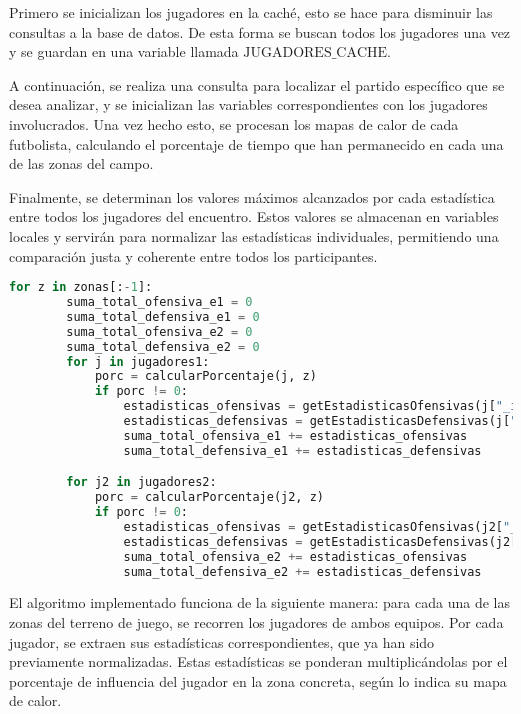 Primero se inicializan los jugadores en la caché, esto se hace para disminuir las consultas a la base de datos. De esta forma se buscan todos los jugadores una vez y se guardan en una variable llamada $\text{JUGADORES\_CACHE}$.

A continuación, se realiza una consulta para localizar el partido específico que se desea analizar, y se inicializan las variables correspondientes con los jugadores involucrados. Una vez hecho esto, se procesan los mapas de calor de cada futbolista, calculando el porcentaje de tiempo que han permanecido en cada una de las zonas del campo.

Finalmente, se determinan los valores máximos alcanzados por cada estadística entre todos los jugadores del encuentro. Estos valores se almacenan en variables locales y servirán para normalizar las estadísticas individuales, permitiendo una comparación justa y coherente entre todos los participantes.

\begin{lstlisting}[language=Python, caption={Procesamiento de cada zona}, label={lst:codigo-python}]
for z in zonas[:-1]:
        suma_total_ofensiva_e1 = 0
        suma_total_defensiva_e1 = 0
        suma_total_ofensiva_e2 = 0
        suma_total_defensiva_e2 = 0
        for j in jugadores1:
            porc = calcularPorcentaje(j, z)
            if porc != 0:
                estadisticas_ofensivas = getEstadisticasOfensivas(j["_id"], maximos) * porc
                estadisticas_defensivas = getEstadisticasDefensivas(j["_id"], maximos) * porc
                suma_total_ofensiva_e1 += estadisticas_ofensivas
                suma_total_defensiva_e1 += estadisticas_defensivas

        for j2 in jugadores2:
            porc = calcularPorcentaje(j2, z)
            if porc != 0:
                estadisticas_ofensivas = getEstadisticasOfensivas(j2["_id"], maximos) * porc
                estadisticas_defensivas = getEstadisticasDefensivas(j2["_id"], maximos) * porc
                suma_total_ofensiva_e2 += estadisticas_ofensivas
                suma_total_defensiva_e2 += estadisticas_defensivas

\end{lstlisting}

El algoritmo implementado funciona de la siguiente manera: para cada una de las zonas del terreno de juego, se recorren los jugadores de ambos equipos. Por cada jugador, se extraen sus estadísticas correspondientes, que ya han sido previamente normalizadas. Estas estadísticas se ponderan multiplicándolas por el porcentaje de influencia del jugador en la zona concreta, según lo indica su mapa de calor.

